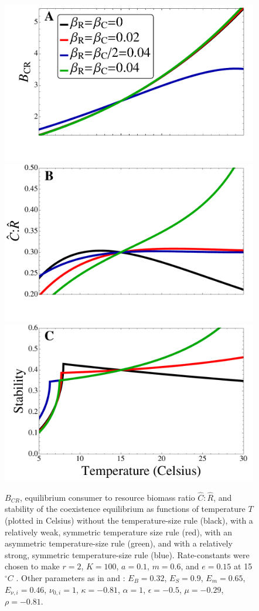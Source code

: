 \documentclass[11pt]{article}
\begin{document}
\begin{figure}[!ht]
\centering
\includegraphics[width=0.5\linewidth]{Figure2A}\\\vspace{-0.75cm}
\includegraphics[width=0.5\linewidth]{Figure2B}\\\vspace{-0.75cm}
\includegraphics[width=0.5\linewidth]{Figure2C}
\caption{
$B_{CR}$, equilibrium consumer to resource biomass ratio $\hat{C}:\hat{R}$, and stability of the coexistence equilibrium as functions of temperature $T$ (plotted in Celsius) without the temperature-size rule (black), with a relatively weak, symmetric temperature size rule (red), with an asymmetric temperature-size rule (green), and with a relatively strong, symmetric temperature-size rule (blue).
Rate-constants were chosen to make $r = 2$, $K = 100$, $a = 0.1$, $m = 0.6$, and $e = 0.15$ at 15$^\circ C$ \citep[as in Figure 3 of][]{Gilbert2014}.
Other parameters as in \cite{Gilbert2014} and \cite{DeLong2015}: $E_B = 0.32$, $E_S = 0.9$, $E_m = 0.65$, $E_{\nu,i} = 0.46$, $\nu_{0,i} = 1$, $\kappa = -0.81$, $\alpha = 1$, $\epsilon = -0.5$, $\mu = -0.29$, $\rho = -0.81$.
}
\label{StrengthAsymm}
\end{figure}
\end{document}
